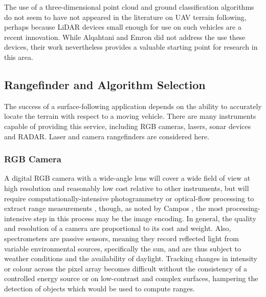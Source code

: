 \documentclass[10pt]{report}
\begin{document}
The use of a three-dimensional point cloud and ground classification algorithms do not seem to have not appeared in the literature on UAV terrain following, perhaps because LiDAR devices small enough for use on such vehicles are a recent innovation. While Alqahtani and Emron did not address the use these devices, their work nevertheless provides a valuable starting point for research in this area. 

\iffalse

*** The power required by the vehicle following any trajectory can be calculated by taking the integral of the function decribing the thrust or power curve. This curve will be something like figure \ref{fig:uav_power_curve}.


\begin{equation}
T_d = \dfrac{v}{\sin(\theta) * E}
\label{eq:decel}
\end{equation} 

\begin{figure}
\centering
\def\svgscale{0.8}

\caption{The power curve of a terrain-following event.}
\label{fig:uav_power_curve}
\end{figure}

\fi

\subsection{Rangefinder and Algorithm Selection}

The success of a surface-following application depends on the ability to accurately locate the terrain with respect to a moving vehicle. There are many instruments capable of providing this service, including RGB cameras, lasers, sonar devices and RADAR. Laser and camera rangefinders are considered here.

\subsubsection{RGB Camera}

A digital RGB camera with a wide-angle lens will cover a wide field of view at high resolution and reasonably low cost relative to other instruments, but will require computationally-intensive photogrammetry or optical-flow processing to extract range measurements \cite{Campos2016,Herisse2010,Netter2002,Hammoud2011}, though, as noted by Campos \cite{Campos2016}, the most processing-intensive step in this process may be the image encoding. In general, the quality and resolution of a camera are proportional to its cost and weight. Also, spectrometers are passive sensors, meaning they record reflected light from variable environmental sources, specifically the sun, and are thus subject to weather conditions and the availability of daylight. Tracking changes in intensity or colour across the pixel array becomes difficult without the consistency of a controlled energy source or on low-contrast and complex surfaces, hampering the detection of objects which would be used to compute ranges. 
\end{document}
